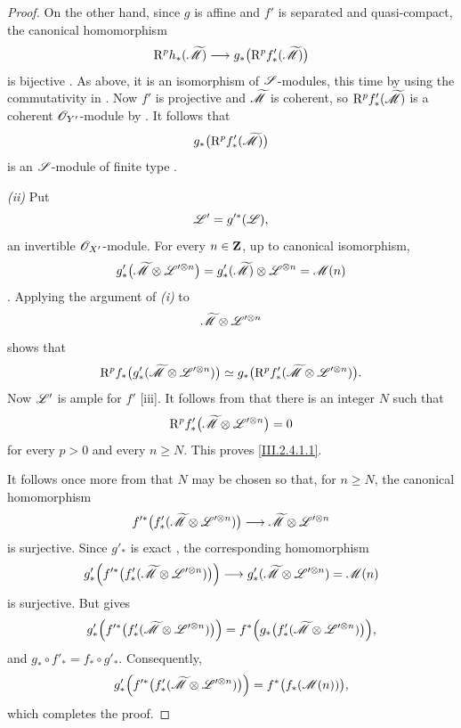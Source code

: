\begin{proof}
On the other hand, since $g$ is affine and $f'$ is separated and quasi-compact, the canonical homomorphism
\[
  \mathrm{R}^p h_*(\widetilde{\mathscr{M}})
  \longrightarrow
  g_*\bigl(\mathrm{R}^p f'_*(\widetilde{\mathscr{M}})\bigr)
\]
is bijective .
As above, it is an isomorphism of $\mathscr{S}$-modules, this time by using the commutativity in .
Now $f'$ is projective and $\widetilde{\mathscr{M}}$ is coherent, so $\mathrm{R}^p f'_*(\widetilde{\mathscr{M}})$ is a coherent $\mathscr{O}_{Y'}$-module by .
It follows that
\[
  g_*\bigl(\mathrm{R}^p f'_*(\widetilde{\mathscr{M}})\bigr)
\]
is an $\mathscr{S}$-module of finite type .

\emph{(ii)} Put
\[
  \mathscr{L}'=g'^*(\mathscr{L}),
\]
an invertible $\mathscr{O}_{X'}$-module.
For every $n\in\mathbf{Z}$, up to canonical isomorphism,
\[
  g'_*\bigl(\widetilde{\mathscr{M}}\otimes\mathscr{L}'^{\otimes n}\bigr)
  =
  g'_*(\widetilde{\mathscr{M}})\otimes\mathscr{L}^{\otimes n}
  =
  \mathscr{M}(n)
\]
.
Applying the argument of \emph{(i)} to
\[
  \widetilde{\mathscr{M}}\otimes\mathscr{L}'^{\otimes n}
\]
shows that
\[
  \mathrm{R}^p f_*
  \bigl(g'_*(\widetilde{\mathscr{M}}\otimes\mathscr{L}'^{\otimes n})\bigr)
  \simeq
  g_*\bigl(\mathrm{R}^p f'_*
  (\widetilde{\mathscr{M}}\otimes\mathscr{L}'^{\otimes n})\bigr).
\]
Now $\mathscr{L}'$ is ample for $f'$ [iii].
It follows from  that there is an integer $N$ such that
\[
  \mathrm{R}^p f'_*
  \bigl(\widetilde{\mathscr{M}}\otimes\mathscr{L}'^{\otimes n}\bigr)=0
\]
for every $p>0$ and every $n\geq N$.
This proves \eqref{III.2.4.1.1}.

It follows once more from  that $N$ may be chosen so that, for $n\geq N$, the canonical homomorphism
\[
  f'^*\bigl(f'_*(\widetilde{\mathscr{M}}\otimes\mathscr{L}'^{\otimes n})\bigr)
  \longrightarrow
  \widetilde{\mathscr{M}}\otimes\mathscr{L}'^{\otimes n}
\]
is surjective.
Since $g'_*$ is exact , the corresponding homomorphism
\[
  g'_*\Bigl(
    f'^*\bigl(f'_*(\widetilde{\mathscr{M}}\otimes\mathscr{L}'^{\otimes n})\bigr)
  \Bigr)
  \longrightarrow
  g'_*(\widetilde{\mathscr{M}}\otimes\mathscr{L}'^{\otimes n})
  =\mathscr{M}(n)
\]
is surjective.
But  gives
\[
  g'_*\Bigl(
    f'^*\bigl(f'_*(\widetilde{\mathscr{M}}\otimes\mathscr{L}'^{\otimes n})\bigr)
  \Bigr)
  =
  f^*\Bigl(
    g_*\bigl(f'_*(\widetilde{\mathscr{M}}\otimes\mathscr{L}'^{\otimes n})\bigr)
  \Bigr),
\]
and $g_*\circ f'_*=f_*\circ g'_*$.
Consequently,
\[
  g'_*\Bigl(
    f'^*\bigl(f'_*(\widetilde{\mathscr{M}}\otimes\mathscr{L}'^{\otimes n})\bigr)
  \Bigr)
  =
  f^*\bigl(f_*(\mathscr{M}(n))\bigr),
\]
which completes the proof.
\end{proof}

